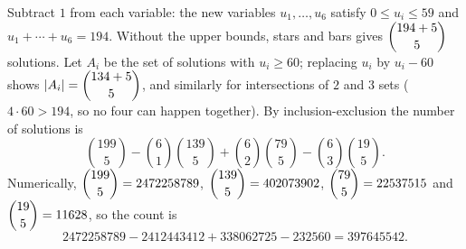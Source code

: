 Subtract $1$ from each variable: the new variables $u_1,\dots,u_6$ satisfy $0\le u_i\le59$ and $u_1+\cdots+u_6=194$. Without the upper bounds, stars and bars gives $\dbinom{194+5}{5}$ solutions. Let $A_i$ be the set of solutions with $u_i\ge60$; replacing $u_i$ by $u_i-60$ shows $|A_i|=\dbinom{134+5}{5}$, and similarly for intersections of $2$ and $3$ sets ($4\cdot60>194$, so no four can happen together). By inclusion-exclusion the number of solutions is
\[
\binom{199}{5}-\binom61\binom{139}{5}+\binom62\binom{79}{5}-\binom63\binom{19}{5}.
\]
Numerically, $\dbinom{199}{5}=2472258789$, $\dbinom{139}{5}=402073902$, $\dbinom{79}{5}=22537515$ and $\dbinom{19}{5}=11628$, so the count is
\[
2472258789-2412443412+338062725-232560=\boxed{397645542}.
\]
